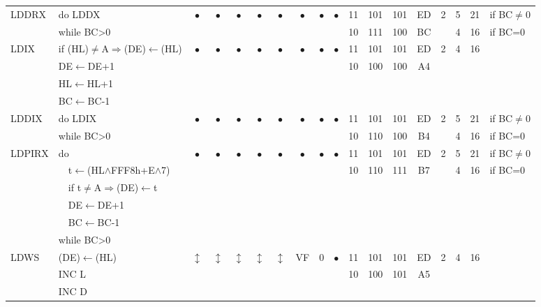 \documentclass[oneside,a4paper]{book}
\newcommand{\instrt}{\rule{0pt}{2.7ex}}
\newcommand{\instrb}{\rule[-1.7ex]{0pt}{0pt}}
\begin{document}
{\begin{tabular}{llcccccccccccccccl}
		LDDRX\instrt & 
			do LDDX & 
			$\bullet$ & 
				$\bullet$ & 
				$\bullet$ & 
				$\bullet$ & 
				$\bullet$ & 
				$\bullet$ & 
				$\bullet$ & 
				$\bullet$ & 
			11 & 101 & 101 & 
			ED & 2 & 
			5 & 21 & if BC$\neq$0 \\
			& while BC>0 & \multicolumn{8}{c}{} & 10 & 111 & 100 & BC & & 4 & 16 & if BC=0 \instrb \\
	
		LDIX\instrt & 
			if (HL)$\neq$A$\Rightarrow$(DE)$\leftarrow$(HL) & 
			$\bullet$ & 
				$\bullet$ & 
				$\bullet$ & 
				$\bullet$ & 
				$\bullet$ & 
				$\bullet$ & 
				$\bullet$ & 
				$\bullet$ & 
			11 & 101 & 101 & 
			ED & 2 &
			4 & 16 & \\
			& DE$\leftarrow$DE+1 & \multicolumn{8}{c}{} & 10 & 100 & 100 & A4 & \\
			& HL$\leftarrow$HL+1 & \\
			& BC$\leftarrow$BC-1 & \instrb \\
	
		LDDIX\instrt & 
			do LDIX & 
			$\bullet$ & 
				$\bullet$ & 
				$\bullet$ & 
				$\bullet$ & 
				$\bullet$ & 
				$\bullet$ & 
				$\bullet$ & 
				$\bullet$ & 
			11 & 101 & 101 & 
			ED & 2 & 
			5 & 21 & if BC$\neq$0 \\
			& while BC>0 & \multicolumn{8}{c}{} & 10 & 110 & 100 & B4 & & 4 & 16 & if BC=0 \instrb \\
	
		LDPIRX\instrt & 
			do & 
			$\bullet$ & 
				$\bullet$ & 
				$\bullet$ & 
				$\bullet$ & 
				$\bullet$ & 
				$\bullet$ & 
				$\bullet$ & 
				$\bullet$ & 
			11 & 101 & 101 & 
			ED & 2 &
			5 & 21 & if BC$\neq$0 \\
			& ~~t$\leftarrow$(HL$\wedge$FFF8h+E$\wedge$7) & \multicolumn{8}{c}{} & 10 & 110 & 111 & B7 & & 4 & 16 & if BC=0 \\
			& ~~if t$\neq$A$\Rightarrow$(DE)$\leftarrow$t & \\
			& ~~DE$\leftarrow$DE+1 & \\
			& ~~BC$\leftarrow$BC-1 & \\
			& while BC>0 & \instrb \\
	
		LDWS\instrt & 
			(DE)$\leftarrow$(HL) & 
			$\updownarrow$ & 
				$\updownarrow$ & 
				$\updownarrow$ & 
				$\updownarrow$ & 
				$\updownarrow$ & 
				VF & 
				0 & 
				$\bullet$ & 
			11 & 101 & 101 & 
			ED & 2 &
			4 & 16 & \\
			& INC L & \multicolumn{8}{c}{} & 10 & 100 & 101 & A5 & \\
			& INC D & \instrb \\


\end{tabular}}
\end{document}
